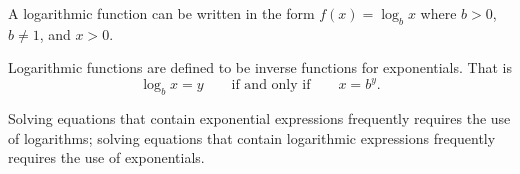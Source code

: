 



\begin{summary}
\item A logarithmic function can be written in the form $f(x)=\log_{b}x$ where $b>0$, $b\ne1$, and $x>0$.
\item Logarithmic functions are defined to be inverse functions for exponentials.  That is
	\[
		\log_{b}x=y\qquad\mbox{if and only if}\qquad x=b^{y}.
	\]
\item Solving equations that contain exponential expressions frequently requires the use of logarithms; solving equations that contain logarithmic expressions frequently requires the use of exponentials.
\end{summary}






\clearpage
